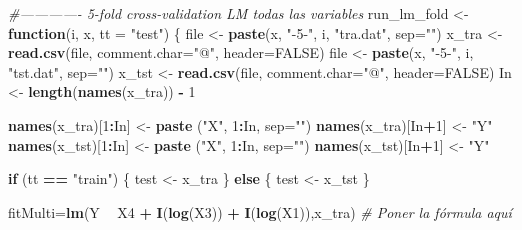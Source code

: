 \documentclass[
]{article}
\newenvironment{Shaded}{\begin{snugshade}}{\end{snugshade}}
\newcommand{\CommentTok}[1]{\textcolor[rgb]{0.56,0.35,0.01}{\textit{#1}}}
\newcommand{\ControlFlowTok}[1]{\textcolor[rgb]{0.13,0.29,0.53}{\textbf{#1}}}
\newcommand{\DataTypeTok}[1]{\textcolor[rgb]{0.13,0.29,0.53}{#1}}
\newcommand{\DecValTok}[1]{\textcolor[rgb]{0.00,0.00,0.81}{#1}}
\newcommand{\KeywordTok}[1]{\textcolor[rgb]{0.13,0.29,0.53}{\textbf{#1}}}
\newcommand{\NormalTok}[1]{#1}
\newcommand{\OperatorTok}[1]{\textcolor[rgb]{0.81,0.36,0.00}{\textbf{#1}}}
\newcommand{\OtherTok}[1]{\textcolor[rgb]{0.56,0.35,0.01}{#1}}
\newcommand{\StringTok}[1]{\textcolor[rgb]{0.31,0.60,0.02}{#1}}
\begin{document}
\begin{Shaded}
\begin{Highlighting}[]
\CommentTok{#------------- 5-fold cross-validation LM todas las variables}
\NormalTok{run_lm_fold <-}\StringTok{ }\ControlFlowTok{function}\NormalTok{(i, x, }\DataTypeTok{tt =} \StringTok{"test"}\NormalTok{) \{}
\NormalTok{    file <-}\StringTok{ }\KeywordTok{paste}\NormalTok{(x, }\StringTok{"-5-"}\NormalTok{, i, }\StringTok{"tra.dat"}\NormalTok{, }\DataTypeTok{sep=}\StringTok{""}\NormalTok{)}
\NormalTok{    x_tra <-}\StringTok{ }\KeywordTok{read.csv}\NormalTok{(file, }\DataTypeTok{comment.char=}\StringTok{"@"}\NormalTok{, }\DataTypeTok{header=}\OtherTok{FALSE}\NormalTok{)}
\NormalTok{    file <-}\StringTok{ }\KeywordTok{paste}\NormalTok{(x, }\StringTok{"-5-"}\NormalTok{, i, }\StringTok{"tst.dat"}\NormalTok{, }\DataTypeTok{sep=}\StringTok{""}\NormalTok{)}
\NormalTok{    x_tst <-}\StringTok{ }\KeywordTok{read.csv}\NormalTok{(file, }\DataTypeTok{comment.char=}\StringTok{"@"}\NormalTok{, }\DataTypeTok{header=}\OtherTok{FALSE}\NormalTok{)}
\NormalTok{    In <-}\StringTok{ }\KeywordTok{length}\NormalTok{(}\KeywordTok{names}\NormalTok{(x_tra)) }\OperatorTok{-}\StringTok{ }\DecValTok{1}
    
    \KeywordTok{names}\NormalTok{(x_tra)[}\DecValTok{1}\OperatorTok{:}\NormalTok{In] <-}\StringTok{ }\KeywordTok{paste}\NormalTok{ (}\StringTok{"X"}\NormalTok{, }\DecValTok{1}\OperatorTok{:}\NormalTok{In, }\DataTypeTok{sep=}\StringTok{""}\NormalTok{)}
    \KeywordTok{names}\NormalTok{(x_tra)[In}\OperatorTok{+}\DecValTok{1}\NormalTok{] <-}\StringTok{ "Y"}
    \KeywordTok{names}\NormalTok{(x_tst)[}\DecValTok{1}\OperatorTok{:}\NormalTok{In] <-}\StringTok{ }\KeywordTok{paste}\NormalTok{ (}\StringTok{"X"}\NormalTok{, }\DecValTok{1}\OperatorTok{:}\NormalTok{In, }\DataTypeTok{sep=}\StringTok{""}\NormalTok{)}
    \KeywordTok{names}\NormalTok{(x_tst)[In}\OperatorTok{+}\DecValTok{1}\NormalTok{] <-}\StringTok{ "Y"}
    
    \ControlFlowTok{if}\NormalTok{ (tt }\OperatorTok{==}\StringTok{ "train"}\NormalTok{) \{}
\NormalTok{        test <-}\StringTok{ }\NormalTok{x_tra}
\NormalTok{    \}}
    \ControlFlowTok{else}\NormalTok{ \{}
\NormalTok{        test <-}\StringTok{ }\NormalTok{x_tst}
\NormalTok{    \}}
    
\NormalTok{    fitMulti=}\KeywordTok{lm}\NormalTok{(Y }\OperatorTok{~}\StringTok{ }\NormalTok{X4 }\OperatorTok{+}\StringTok{ }\KeywordTok{I}\NormalTok{(}\KeywordTok{log}\NormalTok{(X3)) }\OperatorTok{+}\StringTok{ }\KeywordTok{I}\NormalTok{(}\KeywordTok{log}\NormalTok{(X1)),x_tra)  }\CommentTok{# Poner la fórmula aquí}
    

\end{Highlighting}
\end{Shaded}
\end{document}
